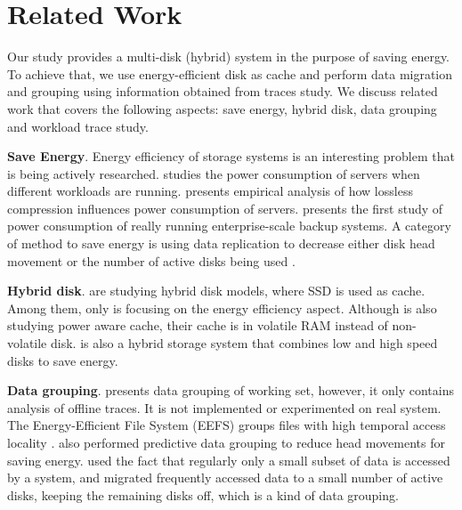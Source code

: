 \section{Related Work} 
\label{sec:related} 

Our study provides a multi-disk (hybrid) system in the purpose of
saving energy. To achieve that, we use energy-efficient disk as cache
and perform data migration and grouping using information obtained
from traces study. We discuss related work that covers the following
aspects: save energy, hybrid disk, data grouping and workload trace
study.

\textbf{Save Energy}. Energy efficiency of storage systems is an
interesting problem that is being actively researched.
\cite{fast10fsgreen} studies the power consumption of servers when
different workloads are running.  \cite{systor09greencomp} presents
empirical analysis of how lossless compression influences power
consumption of servers. \cite{fast12emc-energy} presents the first
study of power consumption of really running enterprise-scale backup
systems. A category of method to save energy is using data replication
to decrease either disk head movement \cite{huangfs2,
pred_data_grouping} or the number of active disks being used
\cite{Weddle07paraid}. 

\textbf{Hybrid disk}. \cite{Bisson07ahybrid, Debnath_SkimpyStash,
Debnath_Bloomflash, flashcache_experiments} are studying hybrid disk
models, where SSD is used as cache. Among them, only
\cite{Bisson07ahybrid} is focusing on the energy efficiency aspect.
Although \cite{Zhu04reducingenergy} is also studying power aware
cache, their cache is in volatile RAM instead of non-volatile disk.
\cite{slow_fast} is also a hybrid storage system that combines low and
high speed disks to save energy.

\textbf{Data grouping}. \cite{Wildani_grouping} presents data
grouping of working set, however, it only contains analysis of offline
traces. It is not implemented or experimented on real system. The
Energy-Efficient File System (EEFS) groups files with high temporal
access locality \cite{Li06highperformance}. \cite{pred_data_grouping}
also performed predictive data grouping to reduce head movements for
saving energy. \cite{migration04} used the fact that regularly only a
small subset of data is accessed by a system, and migrated frequently
accessed data to a small number of active disks, keeping the remaining
disks off, which is a kind of data grouping.


